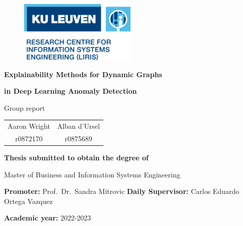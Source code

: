 \begin{titlepage}

\begin{figure}[h]
    {\includegraphics[width=0.5\textwidth]{images/logo.png}}
\end{figure}

\vspace*{2cm}
{\Huge \textbf{Explainability Methods for Dynamic Graphs}}

\vspace{.1cm}
{\Huge \textbf{in Deep Learning Anomaly Detection}}
\vspace*{0.5cm} 

{\Large Group report}

{\raggedleft\vfill{
\setlength{\tabcolsep}{12pt}
\begin{tabular}{c c}
        {\Large Aaron Wright}  &  {\Large Alban d'Ursel} \\
        {r0872170}  & {r0875689}
\end{tabular}
\linebreak
\vspace*{1.5cm}

\textbf{{\large Thesis submitted to obtain \linebreak
the degree of}} \linebreak

{\large Master of Business and Information Systems Engineering}\linebreak

\textbf{{\large Promoter:}}   Prof.\ Dr.\ Sandra Mitrovic \linebreak
\textbf{{\large Daily Supervisor:}}  Carlos Eduardo Ortega Vazquez \linebreak

\textbf{{\large Academic year:}} {\large 2022-2023}
\linebreak
}\par}

\end{titlepage}
\restoregeometry
\clearpage